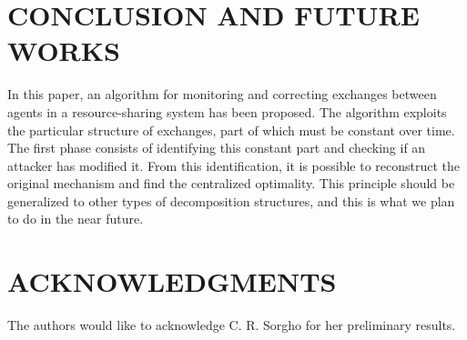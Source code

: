 \documentclass[a4paper, 10 pt, conference]{ieeeconf}  %
\begin{document}
\section{CONCLUSION AND FUTURE WORKS}\label{sec:CC}

In this paper, an algorithm for monitoring and correcting exchanges between agents in a resource-sharing system has been proposed.
The algorithm exploits the particular structure of exchanges, part of which must be constant over time.
The first phase consists of identifying this constant part and checking if an attacker has modified it.
From this identification, it is possible to reconstruct the original mechanism and find the centralized optimality.
This principle should be generalized to other types of decomposition structures, and this is what we plan to do in the near future.

\section{ACKNOWLEDGMENTS}\label{sec:ACK}

The authors would like to acknowledge C. R. Sorgho for her preliminary results.




\end{document}
